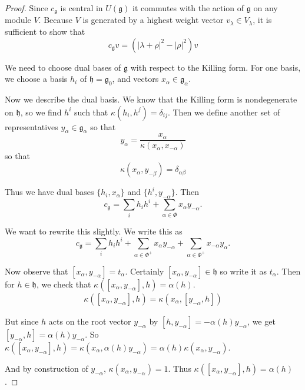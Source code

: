 \documentclass[12pt]{article}
\begin{document}
\begin{proof}
    Since $c_{\mathfrak{g}}$ is central in $U(\mathfrak{g})$ it commutes with the action of
    $\mathfrak{g}$ on any module $V$. Because $V$ is generated by a highest weight vector
    $v_\lambda \in V_\lambda$, it is sufficient to show that
    \[
        c_{\mathfrak{g}} v = (|\lambda + \rho|^2 - |\rho|^2)v
    \]

    We need to choose dual bases of $\mathfrak{g}$ with respect to the Killing form.
    For one basis, we choose a basis $h_i$ of $\mathfrak{h} = \mathfrak{g}_0$,
    and vectors $x_\alpha \in \mathfrak{g}_\alpha$.

    Now we describe the dual basis. We know that the Killing form is nondegenerate on $\mathfrak{h}$,
    so we find $h^i$ such that $\kappa(h_i,h^j) = \delta_{ij}$.
    Then we define another set of representatives $y_\alpha \in \mathfrak{g}_\alpha$ so that
    \[
        y_\alpha = \frac{x_\alpha}{\kappa(x_\alpha,x_{-\alpha})}
    \]
    so that
    \[
        \kappa(x_\alpha, y_{-\beta}) = \delta_{\alpha\beta}
    \]

    Thus we have dual bases $\{h_i, x_\alpha\}$ and $\{h^i, y_{-\alpha}\}$.
    Then
    \[
        c_{\mathfrak{g}} = \sum_i h_i h^i + \sum_{\alpha \in \Phi} x_\alpha y_{-\alpha}.
    \]

    We want to rewrite this slightly. We write this as
    \[
        c_{\mathfrak{g}} = \sum_i h_i h^i + \sum_{\alpha \in \Phi^+} x_\alpha y_{-\alpha}
        + \sum_{\alpha \in \Phi^+} x_{-\alpha} y_\alpha.
    \]



    Now observe that $[x_\alpha,y_{-\alpha}] = t_\alpha$. Certainly $[x_\alpha,y_{-\alpha}] \in \mathfrak{h}$ so write it as $t_\alpha$. Then for $h \in \mathfrak{h}$, we check that $\kappa([x_\alpha,y_{-\alpha}],h) = \alpha(h)$.
    \begin{align*}
        \kappa([x_\alpha, y_{-\alpha}], h) = \kappa(x_\alpha, [y_{-\alpha}, h])
    \end{align*}

    But since $h$ acts on the root vector $y_{-\alpha}$ by $[h,y_{-\alpha}] = -\alpha(h)y_{-\alpha}$, we get $[y_{-\alpha},h] = \alpha(h) y_{-\alpha}$. So $\kappa([x_\alpha,y_{-\alpha}], h) = \kappa(x_\alpha, \alpha(h) y_{-\alpha}) = \alpha(h)\kappa(x_\alpha,y_{-\alpha})$.

    And by construction of $y_{-\alpha}$, $\kappa(x_\alpha,y_{-\alpha})=1$.
    Thus
    $\kappa([x_\alpha,y_{-\alpha}],h) = \alpha(h)$.


\end{proof}
\end{document}
